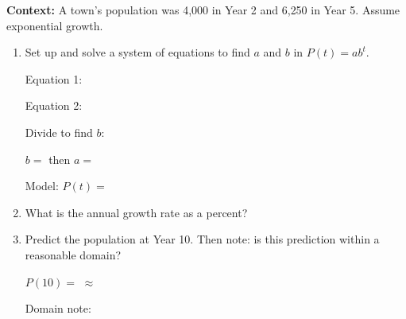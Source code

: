 \documentclass[10pt]{article}
\begin{document}
\vspace{0.1in}

\begin{tcolorbox}[colback=white, colframe=black!40,
    title=\textbf{Tier A --- Apply},
    fonttitle=\bfseries, arc=2mm, left=3mm, right=3mm, top=2mm, bottom=2mm]

\textbf{Context:} A town's population was 4{,}000 in Year 2 and 6{,}250 in Year 5.
Assume exponential growth.

\begin{enumerate}[itemsep=10pt]
  \item Set up and solve a system of equations to find $a$ and $b$ in $P(t) = ab^t$.

        \vspace{0.06in}
        Equation 1: \blank{7cm}

        Equation 2: \blank{7cm}

        Divide to find $b$: \blank{8cm}

        \vspace{0.04in}
        $b = $ \blank{3cm} \quad then $a = $ \blank{4cm}

        \vspace{0.04in}
        Model: $P(t) = $ \blank{7cm}

  \item What is the annual growth rate as a percent? \blank{5cm}

  \item Predict the population at Year 10. Then note: is this prediction within a reasonable domain?

        \vspace{0.06in}
        $P(10) = $ \blank{6cm} $\approx$ \blank{4cm}

        \vspace{0.04in}
        Domain note: \blank{8cm}
\end{enumerate}
\end{tcolorbox}

\vspace{0.1in}
\end{document}
